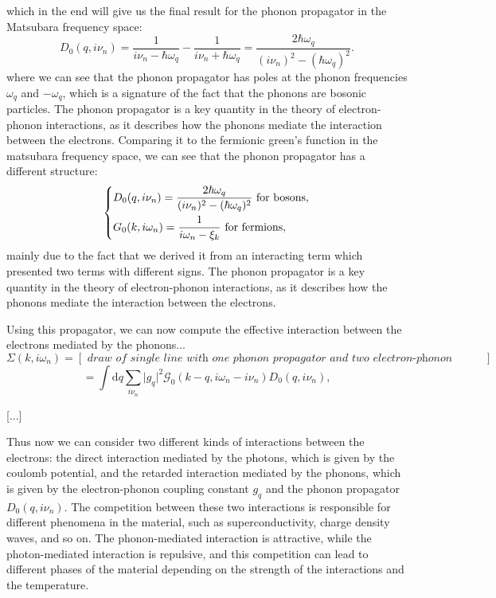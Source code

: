 which in the end will give us the final result for the phonon propagator in the Matsubara frequency space:
\[
    D_0(q, i \nu_n) = \frac{1}{i \nu_n - \hbar \omega_q} - \frac{1}{i \nu_n + \hbar \omega_q} = \frac{2 \hbar \omega_q}{(i \nu_n)^2 - (\hbar \omega_q)^2}.
\]
where we can see that the phonon propagator has poles at the phonon frequencies \(\omega_q\) and \(-\omega_q\), which is a signature of the fact that the phonons are bosonic particles. The phonon propagator is a key quantity in the theory of electron-phonon interactions, as it describes how the phonons mediate the interaction between the electrons. Comparing it to the fermionic green's function in the matsubara frequency space, we can see that the phonon propagator has a different structure:
\[
    \begin{dcases}
        D_0 (q, i \nu_n) = \frac{2 \hbar \omega_q}{(i \nu_n)^2 - (\hbar \omega_q)^2} \text{ for bosons}, \\
        G_0 (k, i \omega_n) = \frac{1}{i \omega_n - \xi_k} \text{ for fermions},
    \end{dcases}
\]
mainly due to the fact that we derived it from an interacting term which presented two terms with different signs. The phonon propagator is a key quantity in the theory of electron-phonon interactions, as it describes how the phonons mediate the interaction between the electrons.

Using this propagator, we can now compute the effective interaction between the electrons mediated by the phonons...
\[
    \Sigma(k, i \omega_n) = [\textit{ draw of single line with one phonon propagator and two electron-phonon vertices }]
\]
\[
    = \int \mathrm{d}q \sum_{i \nu_n} \vert g_q \vert^2 \mathcal{G}_0 (k-q, i \omega_n - i \nu_n) D_0(q, i \nu_n),
\]

[...]

Thus now we can consider two different kinds of interactions between the electrons: the direct interaction mediated by the photons, which is given by the coulomb potential, and the retarded interaction mediated by the phonons, which is given by the electron-phonon coupling constant \(g_q\) and the phonon propagator \(D_0(q, i \nu_n)\). The competition between these two interactions is responsible for different phenomena in the material, such as superconductivity, charge density waves, and so on. The phonon-mediated interaction is attractive, while the photon-mediated interaction is repulsive, and this competition can lead to different phases of the material depending on the strength of the interactions and the temperature.

